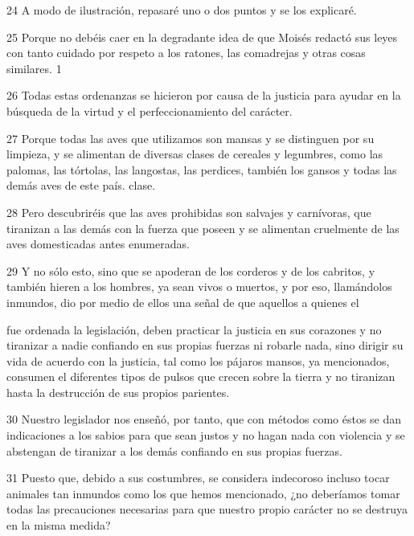 \par 24 A modo de ilustración, repasaré uno o dos puntos y se los explicaré.

\par 25 Porque no debéis caer en la degradante idea de que Moisés redactó sus leyes con tanto cuidado por respeto a los ratones, las comadrejas y otras cosas similares. 1

\par 26 Todas estas ordenanzas se hicieron por causa de la justicia para ayudar en la búsqueda de la virtud y el perfeccionamiento del carácter.

\par 27 Porque todas las aves que utilizamos son mansas y se distinguen por su limpieza, y se alimentan de diversas clases de cereales y legumbres, como las palomas, las tórtolas, las langostas, las perdices, también los gansos y todas las demás aves de este país. clase.

\par 28 Pero descubriréis que las aves prohibidas son salvajes y carnívoras, que tiranizan a las demás con la fuerza que poseen y se alimentan cruelmente de las aves domesticadas antes enumeradas.

\par 29 Y no sólo esto, sino que se apoderan de los corderos y de los cabritos, y también hieren a los hombres, ya sean vivos o muertos, y por eso, llamándolos inmundos, dio por medio de ellos una señal de que aquellos a quienes el

fue ordenada la legislación, deben practicar la justicia en sus corazones y no tiranizar a nadie confiando en sus propias fuerzas ni robarle nada, sino dirigir su vida de acuerdo con la justicia, tal como los pájaros mansos, ya mencionados, consumen el diferentes tipos de pulsos que crecen sobre la tierra y no tiranizan hasta la destrucción de sus propios parientes.

\par 30 Nuestro legislador nos enseñó, por tanto, que con métodos como éstos se dan indicaciones a los sabios para que sean justos y no hagan nada con violencia y se abstengan de tiranizar a los demás confiando en sus propias fuerzas.

\par 31 Puesto que, debido a sus costumbres, se considera indecoroso incluso tocar animales tan inmundos como los que hemos mencionado, ¿no deberíamos tomar todas las precauciones necesarias para que nuestro propio carácter no se destruya en la misma medida?

